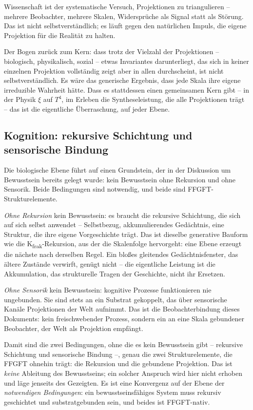 Wissenschaft ist der systematische Versuch, Projektionen zu triangulieren --
mehrere Beobachter, mehrere Skalen, Widersprüche als Signal statt als
Störung. Das ist nicht selbstverständlich; es läuft gegen den natürlichen
Impuls, die eigene Projektion für die Realität zu halten.

Der Bogen zurück zum Kern: dass trotz der Vielzahl der Projektionen --
biologisch, physikalisch, sozial -- etwas Invariantes darunterliegt, das
sich in keiner einzelnen Projektion vollständig zeigt aber in allen
durchscheint, ist nicht selbstverständlich. Es wäre das generische Ergebnis,
dass jede Skala ihre eigene irreduzible Wahrheit hätte. Dass es stattdessen
einen gemeinsamen Kern gibt -- in der Physik $\xi$ auf $T^4$, im Erleben die
Syntheseleistung, die alle Projektionen trägt -- das ist die eigentliche
Überraschung, auf jeder Ebene.

\subsection*{Kognition: rekursive Schichtung und sensorische Bindung}

Die biologische Ebene führt auf einen Grundstein, der in der Diskussion um
Bewusstsein bereits gelegt wurde: kein Bewusstsein ohne Rekursion und ohne
Sensorik. Beide Bedingungen sind notwendig, und beide sind
FFGFT-Strukturelemente.

\emph{Ohne Rekursion} kein Bewusstsein: es braucht die rekursive Schichtung,
die sich auf sich selbst anwendet -- Selbstbezug, akkumulierendes Gedächtnis,
eine Struktur, die ihre eigene Vorgeschichte trägt. Das ist dieselbe
generative Bauform wie die K\textsubscript{frak}-Rekursion, aus der die
Skalenfolge hervorgeht: eine Ebene erzeugt die nächste nach derselben Regel.
Ein bloßes gleitendes Gedächtnisfenster, das ältere Zustände verwirft, genügt
nicht -- die eigentliche Leistung ist die Akkumulation, das strukturelle
Tragen der Geschichte, nicht ihr Ersetzen.

\emph{Ohne Sensorik} kein Bewusstsein: kognitive Prozesse funktionieren nie
ungebunden. Sie sind stets an ein Substrat gekoppelt, das über sensorische
Kanäle Projektionen der Welt aufnimmt. Das ist die Beobachterbindung dieses
Dokuments: kein freischwebender Prozess, sondern ein an eine Skala gebundener
Beobachter, der Welt als Projektion empfängt.

Damit sind die zwei Bedingungen, ohne die es kein Bewusstsein gibt --
rekursive Schichtung und sensorische Bindung --, genau die zwei
Strukturelemente, die FFGFT ohnehin trägt: die Rekursion und die gebundene
Projektion. Das ist \emph{keine} Ableitung des Bewusstseins; ein solcher
Anspruch wird hier nicht erhoben und läge jenseits des Gezeigten. Es ist eine
Konvergenz auf der Ebene der \emph{notwendigen Bedingungen}: ein
bewusstseinsfähiges System muss rekursiv geschichtet und substratgebunden
sein, und beides ist FFGFT-nativ.

